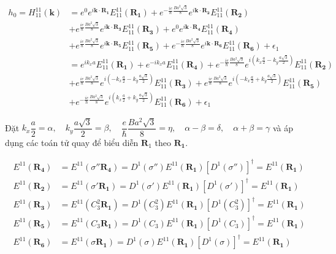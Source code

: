 \documentclass{report}
\begin{document}
\begin{align*}
	h_0 = H_{11}^{11}(\textbf{k}) & = e^{0}e^{i\mathbf{k\cdot R_1}} E_{11}^{11}(\mathbf{R_1}) + e^{-\frac{ie}{\hbar}\frac{Ba^2\sqrt{3}}{8}}e^{i\mathbf{k\cdot R_2}} E_{11}^{11}(\mathbf{R_2})                                                                                                         \\
	                              & + e^{\frac{ie}{\hbar}\frac{Ba^2\sqrt{3}}{8}}e^{i\mathbf{k\cdot R_3}} E_{11}^{11}(\mathbf{R_3}) + e^{0}e^{i\mathbf{k\cdot R_4}} E_{11}^{11}(\mathbf{R_4})                                                                                                          \\
	                              & + e^{\frac{ie}{\hbar}\frac{Ba^2\sqrt{3}}{8}}e^{i\mathbf{k\cdot R_5}} E_{11}^{11}(\mathbf{R_5}) + e^{-\frac{ie}{\hbar}\frac{Ba^2\sqrt{3}}{8}}e^{i\mathbf{k\cdot R_6}} E_{11}^{11}(\mathbf{R_6}) + \epsilon_1                                                       \\
	                              & = e^{ik_xa}E_{11}^{11}(\mathbf{R_1}) + e^{-ik_xa}E_{11}^{11}(\mathbf{R_4}) + e^{-\frac{ie}{\hbar}\frac{Ba^2\sqrt{3}}{8}}e^{i\left(k_x\frac{a}{2} - k_y\frac{a\sqrt{3}}{2}\right)} E_{11}^{11}(\mathbf{R_2})                                                       \\
	                              & + e^{\frac{ie}{\hbar}\frac{Ba^2\sqrt{3}}{8}}e^{i\left(-k_x\frac{a}{2} - k_y\frac{a\sqrt{3}}{2}\right)} E_{11}^{11}(\mathbf{R_3}) + e^{\frac{ie}{\hbar}\frac{Ba^2\sqrt{3}}{8}}e^{i\left(-k_x\frac{a}{2} + k_y\frac{a\sqrt{3}}{2}\right)} E_{11}^{11}(\mathbf{R_5}) \\
	                              & + e^{-\frac{ie}{\hbar}\frac{Ba^2\sqrt{3}}{8}}e^{i\left(k_x\frac{a}{2} + k_y\frac{a\sqrt{3}}{2}\right)} E_{11}^{11}(\mathbf{R_6}) + \epsilon_1
\end{align*}

\noindent Đặt $k_x\dfrac{a}{2} = \alpha,\quad k_y\dfrac{a\sqrt{3}}{2} = \beta, \quad \dfrac{e}{\hbar}\dfrac{Ba^2\sqrt{3}}{8} = \eta ,\quad \alpha - \beta = \delta,\quad \alpha + \beta = \gamma$ và áp dụng các toán tử quay để biểu diễn ${\mathbf{R}}_1$ theo $\mathbf{R_1}$.

\begin{align*}
	E^{11}(\mathbf{R_4}) & = E^{11}(\sigma''\mathbf{R_4}) = D^1(\sigma'') E^{11}(\mathbf{R_1}) \left[D^1(\sigma'')\right]^\dagger = E^{11}(\mathbf{R_1}) \\
	E^{11}(\mathbf{R_2}) & = E^{11}(\sigma'\mathbf{R_1}) = D^1(\sigma') E^{11}(\mathbf{R_1}) \left[D^1(\sigma')\right]^\dagger = E^{11}(\mathbf{R_1})    \\
	E^{11}(\mathbf{R_3}) & = E^{11}(C_3^2\mathbf{R_1}) = D^1(C_3^2) E^{11}(\mathbf{R_1}) \left[D^1(C_3^2)\right]^\dagger = E^{11}(\mathbf{R_1})          \\
	E^{11}(\mathbf{R_5}) & = E^{11}(C_3\mathbf{R_1}) = D^1(C_3) E^{11}(\mathbf{R_1}) \left[D^1(C_3)\right]^\dagger = E^{11}(\mathbf{R_1})                \\
	E^{11}(\mathbf{R_6}) & = E^{11}(\sigma\mathbf{R_1}) = D^1(\sigma) E^{11}(\mathbf{R_1}) \left[D^1(\sigma)\right]^\dagger = E^{11}(\mathbf{R_1})
\end{align*}
\end{document}
